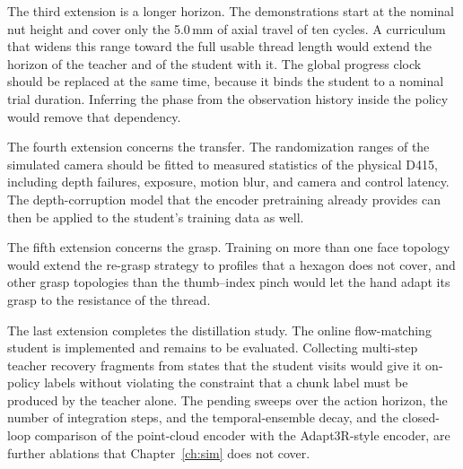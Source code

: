 The third extension is a longer horizon. The demonstrations start at the nominal nut height and cover only the 5.0\,mm of axial travel of ten cycles. A curriculum that widens this range toward the full usable thread length would extend the horizon of the teacher and of the student with it. The global progress clock should be replaced at the same time, because it binds the student to a nominal trial duration. Inferring the phase from the observation history inside the policy would remove that dependency.

The fourth extension concerns the transfer. The randomization ranges of the simulated camera should be fitted to measured statistics of the physical D415, including depth failures, exposure, motion blur, and camera and control latency. The depth-corruption model that the encoder pretraining already provides can then be applied to the student's training data as well.

The fifth extension concerns the grasp. Training on more than one face topology would extend the re-grasp strategy to profiles that a hexagon does not cover, and other grasp topologies than the thumb--index pinch would let the hand adapt its grasp to the resistance of the thread.

The last extension completes the distillation study. The online flow-matching student is implemented and remains to be evaluated. Collecting multi-step teacher recovery fragments from states that the student visits would give it on-policy labels without violating the constraint that a chunk label must be produced by the teacher alone. The pending sweeps over the action horizon, the number of integration steps, and the temporal-ensemble decay, and the closed-loop comparison of the point-cloud encoder with the Adapt3R-style encoder, are further ablations that Chapter~\ref{ch:sim} does not cover.
